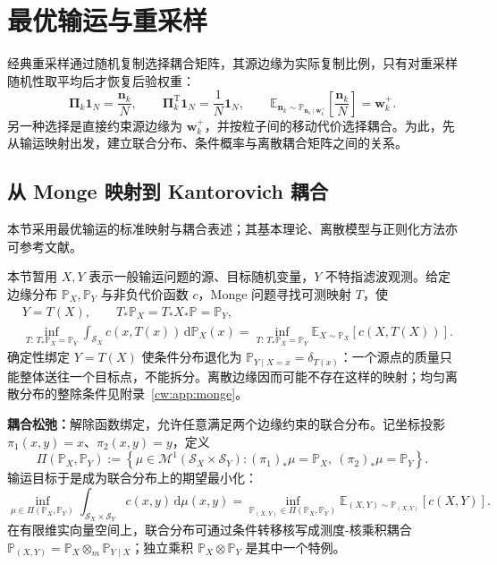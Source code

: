 \section{最优输运与重采样}\label{cw:sec:ot}

经典重采样通过随机复制选择耦合矩阵，其源边缘为实际复制比例，只有对重采样随机性取平均后才恢复后验权重：
\begin{equation}\label{cw:eq:ot-random-marginal}
\bm\Pi_k\mathbf1_N=\frac{\bm n_k}{N},\qquad
\bm\Pi_k^{\mathrm T}\mathbf1_N=\frac1N\mathbf1_N,\qquad
\mathbb E_{\bm n_k\sim\mathbb P_{\bm n_k\mid\bm w_k^+}}
\!\left[\frac{\bm n_k}{N}\right]=\bm w_k^+.
\end{equation}
另一种选择是直接约束源边缘为 $\bm w_k^+$，并按粒子间的移动代价选择耦合。为此，先从输运映射出发，建立联合分布、条件概率与离散耦合矩阵之间的关系。

\subsection{从 Monge 映射到 Kantorovich 耦合}\label{cw:sec:monge}

本节采用最优输运的标准映射与耦合表述\cite{villani2009optimal,peyre2019computational}；其基本理论、离散模型与正则化方法亦可参考文献\cite{ma2019optimaltransportzh}。

本节暂用 $X,Y$ 表示一般输运问题的源、目标随机变量，$Y$ 不特指滤波观测。给定边缘分布 $\mathbb P_X,\mathbb P_Y$ 与非负代价函数 $c$，Monge 问题寻找可测映射 $T$，使
\begin{equation}\label{cw:eq:monge}
\begin{aligned}
&Y=T(X),\qquad T_*\mathbb P_X=T_*X_*\mathbb P=\mathbb P_Y,\\
&\inf_{T:\,T_*\mathbb P_X=\mathbb P_Y}
\int_{\mathcal S_X}c(x,T(x))\,\mathrm d\mathbb P_X(x)
=\inf_{T:\,T_*\mathbb P_X=\mathbb P_Y}
\mathbb E_{X\sim\mathbb P_X}[c(X,T(X))].
\end{aligned}
\end{equation}
确定性绑定 $Y=T(X)$ 使条件分布退化为 $\mathbb P_{Y\mid X=x}=\delta_{T(x)}$：一个源点的质量只能整体送往一个目标点，不能拆分。离散边缘因而可能不存在这样的映射；均匀离散分布的整除条件见附录~\ref{cw:app:monge}。

\textbf{耦合松弛：}解除函数绑定，允许任意满足两个边缘约束的联合分布。记坐标投影 $\pi_1(x,y)=x$、$\pi_2(x,y)=y$，定义
\begin{equation}\label{cw:eq:coupling-family}
\Pi(\mathbb P_X,\mathbb P_Y)
:=\left\{\mu\in\mathcal M^1(\mathcal S_X\times\mathcal S_Y):
(\pi_1)_*\mu=\mathbb P_X,\ (\pi_2)_*\mu=\mathbb P_Y\right\}.
\end{equation}
输运目标于是成为联合分布上的期望最小化：
\begin{equation}\label{cw:eq:kantorovich}
\inf_{\mu\in\Pi(\mathbb P_X,\mathbb P_Y)}
\int_{\mathcal S_X\times\mathcal S_Y}c(x,y)\,\mathrm d\mu(x,y)
=\inf_{\mathbb P_{(X,Y)}\in\Pi(\mathbb P_X,\mathbb P_Y)}
\mathbb E_{(X,Y)\sim\mathbb P_{(X,Y)}}[c(X,Y)].
\end{equation}
在有限维实向量空间上，联合分布可通过条件转移核写成测度-核乘积耦合
$\mathbb P_{(X,Y)}=\mathbb P_X\otimes_m\mathbb P_{Y\mid X}$；独立乘积
$\mathbb P_X\otimes\mathbb P_Y$ 是其中一个特例。

